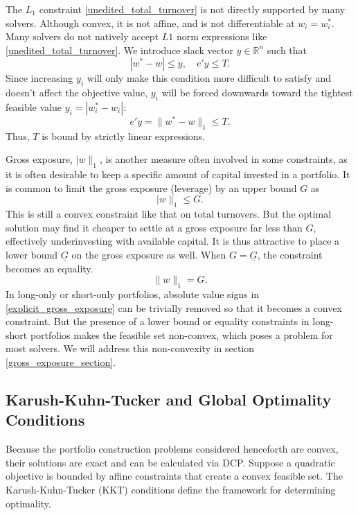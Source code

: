 \documentclass[11pt, letterpaper]{article}
\begin{document}
The $L_1$ constraint \eqref{unedited_total_turnover} is not directly supported by many solvers.  Although convex, it is not
affine, and is not differentiable at $w_i = w_i^*$. Many solvers do not natively accept $L1$ norm expressions like
\eqref{unedited_total_turnover}. We introduce slack vector $y \in \mathds{R}^n$ such that
\begin{equation}\label{eq:tvr-slack}
	|w^* - w| \leq y, \quad e'y \leq T.
\end{equation}
Since increasing $y_i$ will only make this condition more difficult to satisfy and doesn't affect the objective value, $y_i$
will be forced downwards toward the tightest feasible value $y_i = |w_i^* - w_i|$:
\begin{equation*}
    e' y = \lVert w^* - w\rVert_1 \leq T.
\end{equation*}
Thus, $T$ is bound by strictly linear expressions.

Gross exposure, $\lvert w\rVert_1$, is another measure often involved in some constraints, as it is often desirable to keep a
specific amount of capital invested in a portfolio. It is common to limit the gross exposure (leverage) by an upper bound $G$ as
\begin{equation}\label{eq:exposure-ineq}
	\lvert w\rVert_1 \leq G.
\end{equation}
This is still a convex constraint like that on total turnovers. But the optimal solution may find it cheaper to settle at a
gross exposure far less than $G$, effectively underinvesting with available capital. It is thus attractive to place a lower
bound $\underline{G}$ on the gross exposure as well. When $G=\underline{G}$, the constraint becomes an equality.
\begin{equation}
    \label{explicit_gross_exposure}
	\lVert w\rVert_1 = G.
\end{equation}
In long-only or short-only portfolios, absolute value signs in \eqref{explicit_gross_exposure} can be trivially removed so that
it becomes a convex constraint. But the presence of a lower bound or equality constraints in long-short portfolios makes the
feasible set non-convex, which poses a problem for most solvers. We will address this non-convexity in section
\ref{gross_exposure_section}.

\subsection{Karush-Kuhn-Tucker and Global Optimality Conditions}
\label{KKT_section}
Because the portfolio construction problems considered henceforth are convex, their solutions are
exact and can be calculated via DCP. Suppose a quadratic objective is bounded by affine constraints that
create a convex feasible set. The Karush-Kuhn-Tucker (KKT) conditions \cite{boyd2004KKT} define the framework for determining
optimality.
\end{document}
